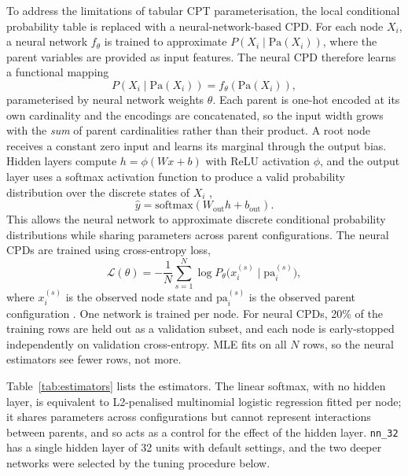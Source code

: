 \documentclass[a4paper,fleqn]{cas-dc}
\newcommand{\Pa}{\mathrm{Pa}}
\begin{document}
To address the limitations of tabular CPT parameterisation, the local conditional probability table is replaced with a neural-network-based CPD. For each node $X_i$, a neural network $f_\theta$ is trained to approximate $P(X_i\mid\Pa(X_i))$, where the parent variables are provided as input features. The neural CPD therefore learns a functional mapping
\begin{equation}
P(X_i\mid\Pa(X_i))=f_\theta(\Pa(X_i)),
\end{equation}
parameterised by neural network weights $\theta$. Each parent is one-hot encoded at its own cardinality and the encodings are concatenated, so the input width grows with the \emph{sum} of parent cardinalities rather than their product. A root node receives a constant zero input and learns its marginal through the output bias. Hidden layers compute $h=\phi(Wx+b)$ with ReLU activation $\phi$, and the output layer uses a softmax activation function to produce a valid probability distribution over the discrete states of $X_i$ \citep{goodfellow2016deep},
\begin{equation}
\hat{y}=\mathrm{softmax}(W_{\mathrm{out}}h+b_{\mathrm{out}}).
\end{equation}
This allows the neural network to approximate discrete conditional probability distributions while sharing parameters across parent configurations. The neural CPDs are trained using cross-entropy loss,
\begin{equation}
\mathcal{L}(\theta)=-\frac{1}{N}\sum_{s=1}^{N}\log P_\theta\big(x_i^{(s)} \mid \mathrm{pa}_i^{(s)}\big),
\end{equation}
where $x_i^{(s)}$ is the observed node state and $\mathrm{pa}_i^{(s)}$ is the observed parent configuration \citep{goodfellow2016deep}. One network is trained per node. For neural CPDs, 20\% of the training rows are held out as a validation subset, and each node is early-stopped independently on validation cross-entropy. MLE fits on all $N$ rows, so the neural estimators see fewer rows, not more.

Table~\ref{tab:estimators} lists the estimators. The linear softmax, with no hidden layer, is equivalent to L2-penalised multinomial logistic regression fitted per node; it shares parameters across configurations but cannot represent interactions between parents, and so acts as a control for the effect of the hidden layer. \texttt{nn\_32} has a single hidden layer of 32 units with default settings, and the two deeper networks were selected by the tuning procedure below.
\end{document}
